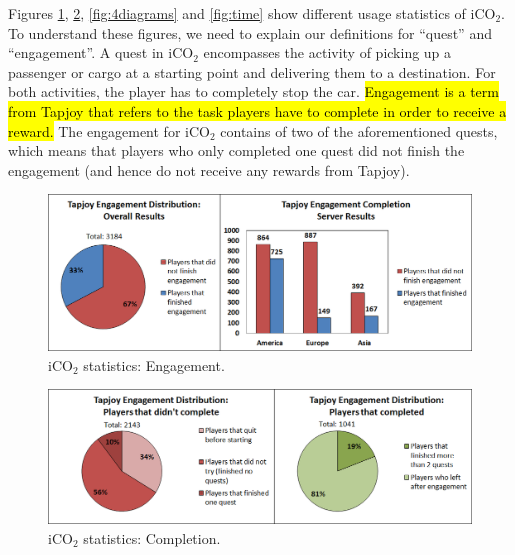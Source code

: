 \documentclass[preprint,authoryear,12pt]{elsarticle}
\newcommand{\hlc}[2][yellow]{ {\sethlcolor{#1} \hl{#2}} }
\begin{document}
Figures \ref{fig:engagement}, \ref{fig:completion}, \ref{fig:4diagrams} and \ref{fig:time} show different usage statistics of iCO$_2$. To understand these figures, we need to explain our definitions for ``quest'' and ``engagement''. A quest in iCO$_2$ encompasses the activity of picking up a passenger or cargo at a starting point and delivering them to a destination. For both activities, the player has to completely stop the car. 
\hlc[green]{Engagement is a term from Tapjoy that refers to the task players have to complete in order to receive a reward.} The engagement for iCO$_2$ contains of two of the aforementioned quests, which means that players who only completed one quest did not finish the engagement (and hence do not receive any rewards from Tapjoy).

\begin{figure}[htb]
	\begin{center}
		\includegraphics[width=.95\linewidth]{ijhcs14-img/engagement}
		\caption{iCO$_2$ statistics: Engagement.\label{fig:engagement}}
	\end{center}
\end{figure}

\begin{figure}[htb]
	\begin{center}
		\includegraphics[width=.95\linewidth]{ijhcs14-img/completion}
		\caption{iCO$_2$ statistics: Completion.\label{fig:completion}}
	\end{center}
\end{figure}
\end{document}

